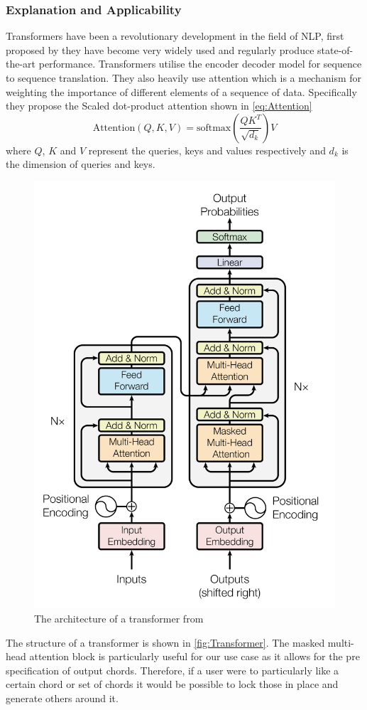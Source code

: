 \subsubsection{Explanation and Applicability}

Transformers have been a revolutionary development in the field of NLP, first proposed by \cite{Transformers} they have become very widely used and regularly produce state-of-the-art performance.
Transformers utilise the encoder decoder model for sequence to sequence translation.
They also heavily use attention which is a mechanism for weighting the importance of different elements of a sequence of data.
Specifically they propose the Scaled dot-product attention shown in \autoref{eq:Attention}
\begin{equation}
    \text{Attention}(Q,K,V) = \text{softmax}(\frac{QK^T}{\sqrt{d_k}})V
    \label{eq:Attention}
\end{equation}
where $Q$, $K$ and $V$ represent the queries, keys and values respectively and $d_k$ is the dimension of queries and keys.

\begin{figure}
    \centering
    \includegraphics[width=0.4\columnwidth]{Figures/Transformer}
    \decoRule
    \caption{The architecture of a transformer from \cite{Transformers}}
    \label{fig:Transformer}
\end{figure}

The structure of a transformer is shown in \autoref{fig:Transformer}.
The masked multi-head attention block is particularly useful for our use case as it allows for the pre specification of output chords.
Therefore, if a user were to particularly like a certain chord or set of chords it would be possible to lock those in place and generate others around it.

